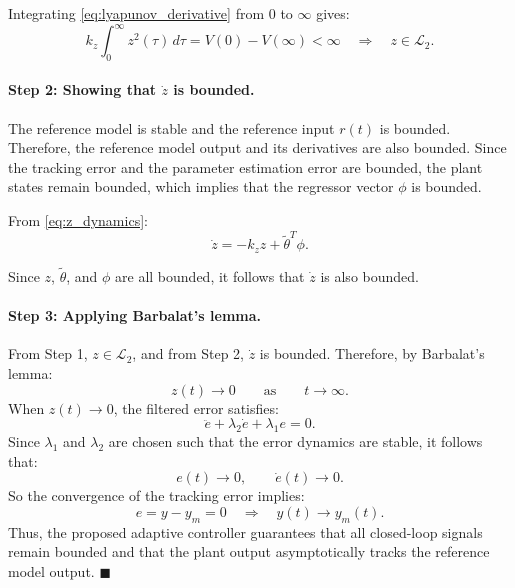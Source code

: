 Integrating \eqref{eq:lyapunov_derivative} from \(0\) to \(\infty\) gives:
\begin{equation}
k_z\int_0^\infty z^2(\tau)\,d\tau = V(0)-V(\infty)<\infty
\quad\Longrightarrow\quad z\in\mathcal{L}_2 .
\end{equation}

\paragraph{Step 2: Showing that \(\dot{z}\) is bounded.}

The reference model is stable and the reference input \(r(t)\) is bounded. Therefore, the reference model output and its derivatives are also bounded. Since the tracking error and the parameter estimation error are bounded, the plant states remain bounded, which implies that the regressor vector \(\phi\) is bounded.

From \eqref{eq:z_dynamics}:
\begin{equation}
\dot{z}
=
-k_z z
+
\tilde{\theta}^{T}\phi.
\end{equation}

Since \(z\), \(\tilde{\theta}\), and \(\phi\) are all bounded, it follows that \(\dot{z}\) is also bounded.

\paragraph{Step 3: Applying Barbalat's lemma.}

From Step 1, \(z\in\mathcal{L}_2\), and from Step 2, \(\dot{z}\) is bounded. Therefore, by Barbalat's lemma:
\begin{equation}
z(t)\rightarrow0
\qquad
\text{as}
\qquad
t\rightarrow\infty.
\end{equation}
When \(z(t)\rightarrow0\), the filtered error satisfies:
\begin{equation}
\ddot{e}
+
\lambda_2\dot{e}
+
\lambda_1e
=
0.
\end{equation}
Since \(\lambda_1\) and \(\lambda_2\) are chosen such that the error dynamics are stable, it follows that:
\begin{equation}
e(t)\rightarrow0,
\qquad
\dot{e}(t)\rightarrow0.
\end{equation}
So the convergence of the tracking error implies:
\begin{equation}
e=y-y_m=0
\quad
\Rightarrow
\quad
y(t)\rightarrow y_m(t).
\end{equation}
Thus, the proposed adaptive controller guarantees that all closed-loop signals remain bounded and that the plant output asymptotically tracks the reference model output. \(\blacksquare\)

\bigskip